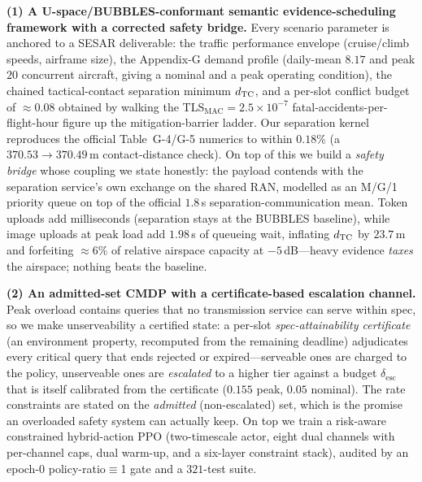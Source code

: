 \textbf{(1) A U-space/BUBBLES-conformant semantic evidence-scheduling
framework with a corrected safety bridge.} Every scenario parameter is
anchored to a SESAR deliverable: the traffic performance envelope
(cruise/climb speeds, airframe size), the Appendix-G demand profile
(daily-mean $8.17$ and peak $20$ concurrent aircraft, giving a nominal and
a peak operating condition), the chained tactical-contact separation
minimum $d_{\mathrm{TC}}$, and a per-slot conflict budget of $\approx\!0.08$ obtained
by walking the TLS$_{\mathrm{MAC}}=2.5\times10^{-7}$
fatal-accidents-per-flight-hour figure up the mitigation-barrier ladder.
Our separation kernel reproduces the official Table~G-4/G-5 numerics to
within $0.18\%$ (a $370.53\to370.49$\,m contact-distance check). On top of
this we build a \emph{safety bridge} whose coupling we state honestly: the
payload contends with the separation service's own exchange on the shared
RAN, modelled as an M/G/1 priority queue on top of the official $1.8$\,s
separation-communication mean. Token uploads add milliseconds (separation
stays at the BUBBLES baseline), while image uploads at peak load add
$1.98$\,s of queueing wait, inflating $d_{\mathrm{TC}}$ by $23.7$\,m and forfeiting
$\approx\!6\%$ of relative airspace capacity at $-5$\,dB---heavy evidence
\emph{taxes} the airspace; nothing beats the baseline.

\textbf{(2) An admitted-set CMDP with a certificate-based escalation
channel.} Peak overload contains queries that no transmission service can
serve within spec, so we make unserveability a certified state: a
per-slot \emph{spec-attainability certificate} (an environment property,
recomputed from the remaining deadline) adjudicates every critical query
that ends rejected or expired---serveable ones are charged to the policy,
unserveable ones are \emph{escalated} to a higher tier against a budget
$\delta_{\mathrm{esc}}$ that is itself calibrated from the certificate
($0.155$ peak, $0.05$ nominal). The rate constraints are stated on the
\emph{admitted} (non-escalated) set, which is the promise an overloaded
safety system can actually keep. On top we train a risk-aware constrained
hybrid-action PPO (two-timescale actor, eight dual channels with
per-channel caps, dual warm-up, and a six-layer constraint stack), audited
by an epoch-0 policy-ratio$\equiv$1 gate and a $321$-test suite.

